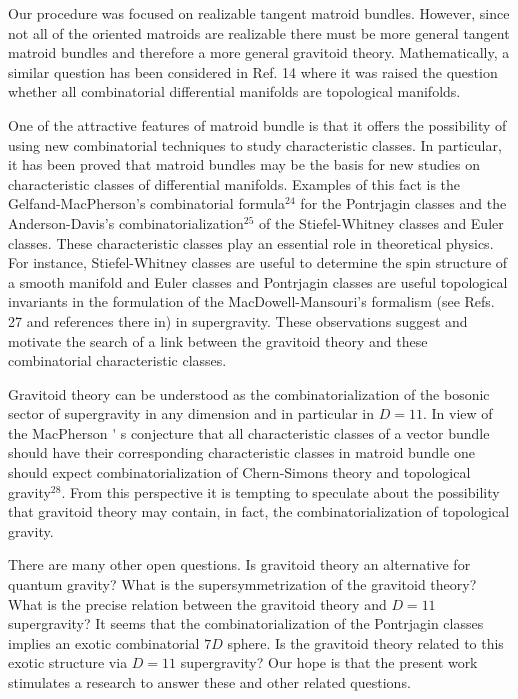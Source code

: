 \documentclass[a4paper,12pt]{article}
\begin{document}
Our procedure was focused on realizable tangent matroid bundles. However,
since not all of the oriented matroids are realizable there must be more
general tangent matroid bundles and therefore a more general gravitoid
theory. Mathematically, a similar question has been considered in Ref. 14
where it was raised the question whether all combinatorial differential
manifolds are topological manifolds.

One of the attractive features of matroid bundle is that it offers the
possibility of using new combinatorial techniques to study characteristic
classes. In particular, it has been proved that matroid bundles may be the
basis for new studies on characteristic classes of differential manifolds.
Examples of this fact is the Gelfand-MacPherson's combinatorial formula$%
^{24} $ for the Pontrjagin classes and the Anderson-Davis's
combinatorialization$^{25}$ of the Stiefel-Whitney classes and Euler
classes. These characteristic classes play an essential role in theoretical
physics. For instance, Stiefel-Whitney classes are useful to determine the
spin structure of a smooth manifold and Euler classes and Pontrjagin classes
are useful topological invariants in the formulation of the
MacDowell-Mansouri's formalism (see Refs. 27 and references there in) in
supergravity. These observations suggest and motivate the search of a link
between the gravitoid theory and these combinatorial characteristic classes.

Gravitoid theory can be understood as the combinatorialization of the
bosonic sector of supergravity in any dimension and in particular in $D=11$.
In view of the MacPherson%
\'{}%
s conjecture that all characteristic classes of a vector bundle should have
their corresponding characteristic classes in matroid bundle one should
expect combinatorialization of Chern-Simons theory and topological gravity$%
^{28}$. From this perspective it is tempting to speculate about the
possibility that gravitoid theory may contain, in fact, the
combinatorialization of topological gravity.

There are many other open questions. Is gravitoid theory an alternative for
quantum gravity? What is the supersymmetrization of the gravitoid theory?
What is the precise relation between the gravitoid theory and $D=11$
supergravity? It seems that the combinatorialization of the Pontrjagin
classes implies an exotic combinatorial $7D$ sphere. Is the gravitoid theory
related to this exotic structure via $D=11$ supergravity? Our hope is that
the present work stimulates a research to answer these and other related
questions.
\end{document}

